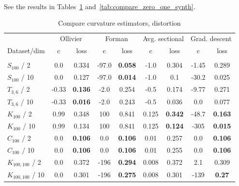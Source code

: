 \documentclass{article} %
\begin{document}
See the results in Tables~\ref{tab:compare_distortion_synth} and~\ref{tab:compare_zero_one_synth}.

\begin{table}[t]
\caption{Compare curvature estimators, distortion}
\label{tab:compare_distortion_synth}
\begin{center}
\begin{tabular}{lcccccc|cc}
&
\multicolumn{2}{c}{Ollivier} &
\multicolumn{2}{c}{Forman} &
\multicolumn{2}{c}{Avg. sectional} &
\multicolumn{2}{|c}{Grad. descent} \\
Dataset/dim & c & loss  & c & loss  & c & loss  & c & loss \\%
 \hline \\
$S_{100}$ / 2 &
0.0 & 0.334 & 
-97.0 & \textbf{0.058} & 
-1.0 & 0.304 &
-1.45 & 0.289 \\
$S_{100}$ / 10 &
0.0 & 0.127 & 
-97.0 & \textbf{0.014} & 
-1.0 & 0.1 & 
-30.2 & 0.025 \\
$T_{3,6}$ / 2 &
-0.33 & \textbf{0.136} & 
-2.0 & 0.254 & 
-0.5 & 0.174 & 
-9.77 & 0.271  \\
$T_{3,6}$ / 10 &
-0.33 & \textbf{0.016} & 
-2.0 & 0.243 & 
-0.5 & 0.036 & 
0.0 & 0.077 \\
$K_{100}$ / 2 & 
0.99 & 0.348 & 
100 & 0.841 & 
0.125 & \textbf{0.342} & 
-48.7 & \textbf{0.163} \\
$K_{100}$ / 10 & 
0.99 & 0.134 & 
100 & 0.841 & 
0.125 & \textbf{0.124} & 
-305 & \textbf{0.015} \\
$C_{100}$ / 2 & 
0.0 & \textbf{0.106} & 
0.0 & \textbf{0.106} & 
0.01 & 0.257 &
0.0 & \textbf{0.106}  \\
$C_{100}$ / 10 & 
0.0 & \textbf{0.106} & 
0.0 & \textbf{0.106} & 
0.01 & 0.255 & 
0.0 & \textbf{0.106} \\
$K_{100,100}$ / 2 &
0.0 & 0.372 & 
-196 & \textbf{0.294} & 
0.008 & 0.372 & 
2.1 & 0.309 \\
$K_{100,100}$ / 10 &
0.0 & 0.301 & 
-196 & \textbf{0.275} & 
0.008 & 0.301 & 
-139 & \textbf{0.27} \\
\end{tabular}
\end{center}
\end{table}
\end{document}
